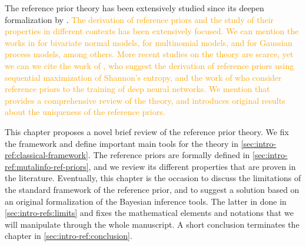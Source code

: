 The reference prior theory has been extensively studied since its deepen formalization by \citet{berger_formal_2009}. 
\textcolor{orange}{The derivation of reference priors and the study of their properties in different contexts has been extensively focused. We can mention the works in \cite{berger_objective_2008} for bivariate normal models, 
 \cite{berger_ordered_1992} for multinomial models,  and \cite{gu_parallel_2016} for Gaussian process models, among others. 
More recent studies on the theory are scarce, yet we can
we cite the work of \citet{bodnar_analytical_2014}, who suggest the derivation of reference priors using sequential maximization of Shannon's entropy, and the work of \citet{gao_deep_2022} 
who consider reference priors to the training of deep neural networks. 
We mention that \citet{mure_objective_2018} provides a comprehensive review of the theory, and introduces original results about the uniqueness of the reference priors.}

This chapter proposes a novel brief review of the reference prior theory. We fix the framework and define important main tools for the theory in \cref{sec:intro-ref:classical-framework}. %
The reference priors are formally defined in \cref{sec:intro-ref:mutalinfo-ref-priors}, and we review its different properties that are proven in the literature.
Eventually, this chapter is the occasion to discuss the limitations of the standard framework of the reference prior, and to suggest a solution based on an original formalization of the Bayesian inference tools.  The latter in done in \cref{sec:intro-refs:limits} and fixes the mathematical elements and notations that we will manipulate through the whole manuscript. A short conclusion terminates the chapter in \cref{sec:intro-ref:conclusion}.









